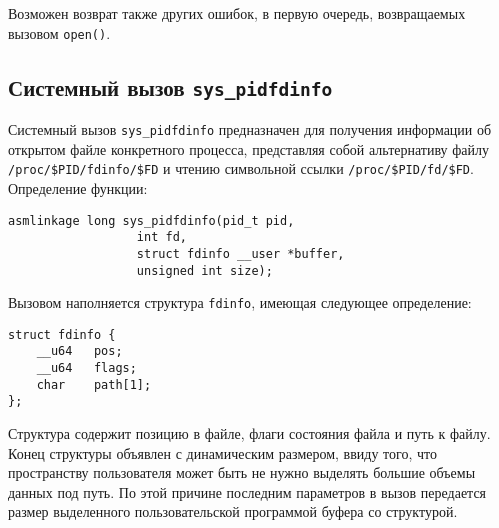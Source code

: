 Возможен возврат также других ошибок, в первую очередь, возвращаемых вызовом
\texttt{open()}.

\subsection{Системный вызов \texttt{sys\_pidfdinfo}}

Системный вызов \texttt{sys\_pidfdinfo} предназначен для получения информации об
открытом файле конкретного процесса, представляя собой
альтернативу файлу \texttt{/proc/\$PID/fdinfo/\$FD} и чтению символьной ссылки 
\texttt{/proc/\$PID/fd/\$FD}. Определение функции:

\medskip
\begin{lstlisting}[style=cstyle]
asmlinkage long sys_pidfdinfo(pid_t pid,
			      int fd,
			      struct fdinfo __user *buffer,
			      unsigned int size);
\end{lstlisting}
\medskip

Вызовом наполняется структура \texttt{fdinfo}, имеющая следующее определение:

\medskip
\begin{lstlisting}[style=cstyle]
struct fdinfo {
	__u64	pos;
	__u64	flags;
	char	path[1];
};
\end{lstlisting}
\medskip

Структура содержит позицию в файле, флаги состояния файла и путь к файлу. Конец
структуры объявлен с динамическим размером, ввиду того, что пространству
пользователя может быть не нужно выделять большие объемы данных под путь. По
этой причине последним параметров в вызов передается размер выделенного
пользовательской программой буфера со структурой.

